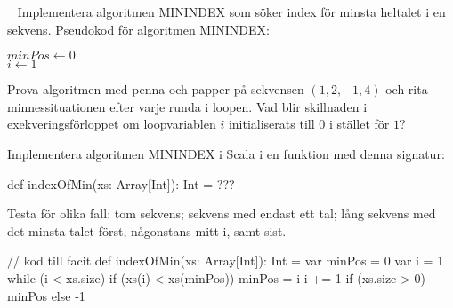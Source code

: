 \SubtaskSolved  {}



\QUESTEND







\ExtraTasks %




\QUESTBEGIN

\Task \label{task:minindex} \what~  Implementera algoritmen MININDEX som söker index för minsta heltalet i en sekvens. Pseudokod för algoritmen MININDEX:

\begin{algorithm}[H]

 $minPos \leftarrow 0 $\\
 $i \leftarrow 1$ \\
\end{algorithm}

\Subtask Prova algoritmen med penna och papper på sekvensen $(1, 2, -1, 4)$ och rita minnessituationen efter varje runda i loopen. Vad blir skillnaden i exekveringsförloppet om loopvariablen $i$  initialiserats till $0$ i stället för $1$?

\Subtask Implementera algoritmen MININDEX i Scala i en funktion med denna signatur:
\begin{Code}
def indexOfMin(xs: Array[Int]): Int = ???
\end{Code}
Testa för olika fall: tom sekvens; sekvens med endast ett tal; lång sekvens med det minsta talet först, någonstans mitt i, samt sist.

\begin{Code}
// kod till facit
def indexOfMin(xs: Array[Int]): Int = {
  var minPos = 0
  var i = 1
  while (i < xs.size) {
    if (xs(i) < xs(minPos)) minPos = i
    i += 1
  }
  if (xs.size > 0) minPos else -1
}


\end{Code}

\SOLUTION


\QUESTEND




